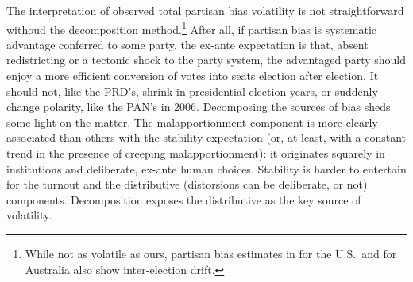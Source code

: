 The interpretation of observed total partisan bias volatility is not straightforward withoud the decomposition method.\footnote{While not as volatile as ours, partisan bias estimates in \citet{gelman.king.1994EvalElSysRedis} for the U.S.\ and \citet{jackmanMeasuringBias1994} for Australia also show inter-election drift.} After all, if partisan bias is systematic advantage conferred to some party, the ex-ante expectation is that, absent redistricting or a tectonic shock to the party system, the advantaged party should enjoy a more efficient conversion of votes into seats election after election. It should not, like the PRD's, shrink in presidential election years, or suddenly change polarity, like the PAN's in 2006. Decomposing the sources of bias sheds some light on the matter. The malapportionment component is more clearly associated than others with the stability expectation (or, at least, with a constant trend in the presence of creeping malapportionment): it originates squarely in institutions and deliberate, ex-ante human choices. Stability is harder to entertain for the turnout \citep[mobilization has an endogenous component,][]{cox.munger.1989,rosenstone.hansen.1993} and the distributive (distorsions can be deliberate, or not) components. Decomposition exposes the distributive as the key source of volatility.

